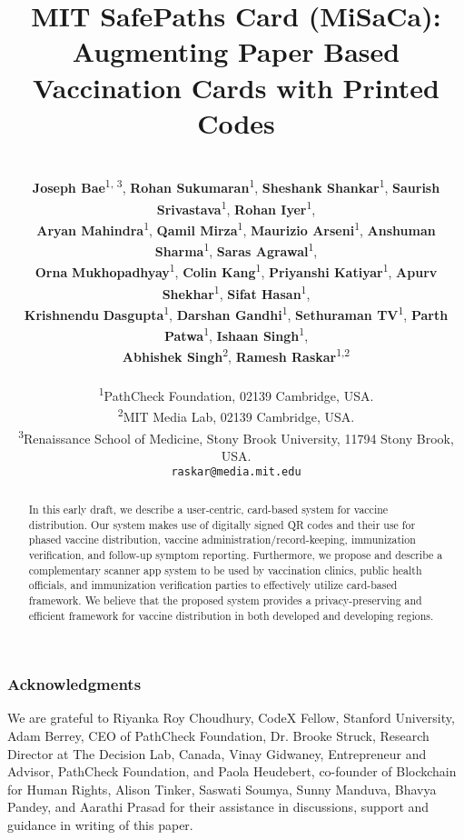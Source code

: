 \documentclass{article} %
\title{MIT SafePaths Card (MiSaCa): Augmenting Paper Based Vaccination Cards with Printed Codes}
\author{\\\textbf{Joseph Bae}\textsuperscript{1, 3}, \textbf{Rohan Sukumaran}\textsuperscript{1}, \textbf{Sheshank Shankar}\textsuperscript{1}, \textbf{Saurish Srivastava}\textsuperscript{1}, \textbf{Rohan Iyer}\textsuperscript{1}, \\\textbf{Aryan Mahindra}\textsuperscript{1}, \textbf{Qamil Mirza}\textsuperscript{1},  \textbf{Maurizio Arseni}\textsuperscript{1},  \textbf{Anshuman Sharma}\textsuperscript{1},  \textbf{Saras Agrawal}\textsuperscript{1}, \\ \textbf{Orna}  \textbf{Mukhopadhyay}\textsuperscript{1}, \textbf{Colin Kang}\textsuperscript{1},  \textbf{Priyanshi Katiyar}\textsuperscript{1},  \textbf{Apurv Shekhar}\textsuperscript{1},  \textbf{Sifat Hasan}\textsuperscript{1},\\ \textbf{Krishnendu} \textbf{Dasgupta}\textsuperscript{1}, \textbf{Darshan Gandhi}\textsuperscript{1},  \textbf{Sethuraman TV}\textsuperscript{1},  \textbf{Parth Patwa}\textsuperscript{1},  \textbf{Ishaan Singh}\textsuperscript{1},\\ \textbf{Abhishek Singh}\textsuperscript{2}, \textbf{Ramesh Raskar}\textsuperscript{1,2}  \\\\
\textsuperscript{1}PathCheck Foundation, 02139 Cambridge, USA.\\
\textsuperscript{2}MIT Media Lab, 02139 Cambridge, USA.\\
\textsuperscript{3}Renaissance School of Medicine, Stony Brook University, 11794 Stony Brook, USA.\\
\texttt{raskar@media.mit.edu} }
\begin{document}
\maketitle

\begin{abstract}
    In this early draft,  we describe a user-centric, card-based system for vaccine distribution. Our system makes use of digitally signed QR codes and their use for phased vaccine distribution, vaccine administration/record-keeping, immunization verification, and follow-up symptom reporting. Furthermore, we propose and describe a complementary scanner app system to be used by vaccination clinics, public health officials, and immunization verification parties to effectively utilize card-based framework. We believe that the proposed system provides a privacy-preserving and efficient framework for vaccine distribution in both developed and developing regions. 
\end{abstract}







\subsubsection*{Acknowledgments}
We are grateful to Riyanka Roy Choudhury, CodeX Fellow, Stanford University, Adam Berrey, CEO of PathCheck Foundation, Dr. Brooke Struck, Research Director at The Decision Lab, Canada, Vinay Gidwaney, Entrepreneur and Advisor, PathCheck Foundation, and Paola Heudebert, co-founder of Blockchain for Human Rights, Alison Tinker, Saswati Soumya, Sunny Manduva, Bhavya Pandey, and Aarathi Prasad for their assistance in discussions, support and guidance in writing of this paper.




\end{document}
